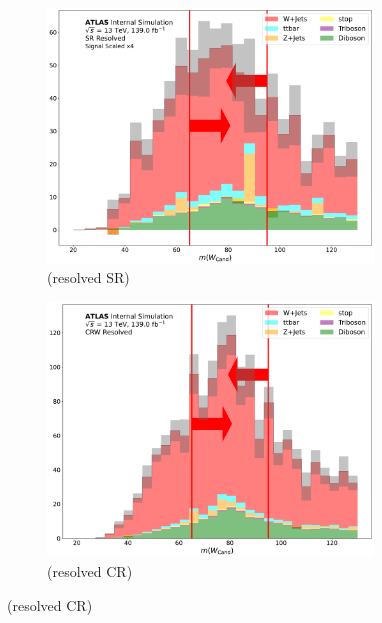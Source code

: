 \begin{figure}[htbp]
  \begin{subfigure}{0.45\textwidth}
     \includegraphics[width = 0.95\textwidth]{Figures/App_SR_CR_distributions/SR1L_Resolved/WCand_m_N_1.pdf}
    \caption{\Wcandm (resolved SR)}
     \end{subfigure}
    \begin{subfigure}{0.45\textwidth}
     \includegraphics[width = 0.95\textwidth]{Figures/App_SR_CR_distributions/CRW_Resolved/WCand_m_N_1.pdf}
     \caption{\Wcandm (resolved \wjets CR)}
     \end{subfigure}


\end{figure}
